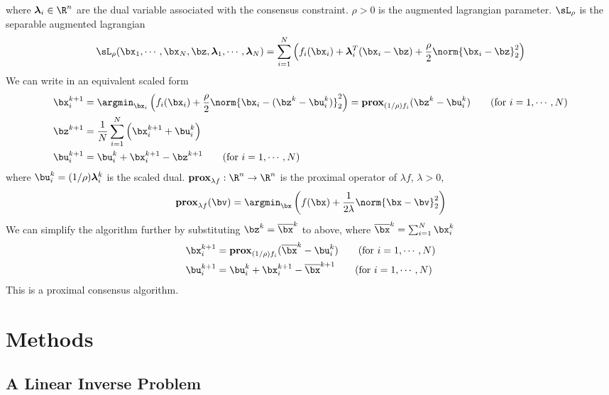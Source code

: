 \documentclass[11pt]{article}
\newcommand{\prox}{\textbf{prox}}
\newcommand{\blambda}{\boldsymbol{\lambda}}
\begin{document}
where $\blambda_i\in\R^n$ are the dual variable associated with the consensus constraint. $\rho>0$ is the augmented lagrangian parameter. $\sL_{\rho}$ is the separable augmented lagrangian
\[
    \sL_{\rho}(\bx_1,\cdots,\bx_N,\bz,\blambda_1,\cdots,\blambda_N) = \sum_{i=1}^N 
        \left( 
            f_i(\bx_i) + \blambda_i^T (\bx_i-\bz) + \frac{\rho}{2} \norm{\bx_i-\bz}_2^2 
        \right)
\]
We can write in an equivalent scaled form 
\begin{align*}
    \bx_i^{k+1} 
        &= \argmin_{\bx_i} \left( f_i(\bx_i) + \frac{\rho}{2} \norm{\bx_i-(\bz^k-\bu_i^k)}_2^2 \right) 
         = \prox_{(1/\rho)f_i}(\bz^k-\bu_i^k) 
         \tag{for $i=1,\cdots,N$}\\
    \bz^{k+1}
        &= \frac{1}{N} \sum_{i=1}^N \left( \bx_i^{k+1} + \bu_i^k \right) \\
    \bu_i^{k+1}
        &= \bu_i^k + \bx_i^{k+1} - \bz^{k+1} \tag{for $i=1,\cdots,N$}
\end{align*}
where $\bu_i^k = (1/\rho)\blambda_i^k$ is the scaled dual. $\prox_{\lambda f}: \R^n \to \R^n$ is the proximal operator of $\lambda f$, $\lambda >0$, 
\[
    \prox_{\lambda f}(\bv) = \argmin_{\bx} \left( f(\bx) + \frac{1}{2\lambda} \norm{\bx-\bv}_2^2 \right)    
\]
We can simplify the algorithm further by substituting $\bz^k = \overline{\bx}^k$ to above, where $\overline{\bx}^k = \sum_{i=1}^N \bx_i^k$ \cite{boydDistributedOptimizationStatistical2011,parikhProximalAlgorithms2014} 
\begin{align*}
    \bx_i^{k+1} 
        &= \prox_{(1/\rho)f_i}(\overline{\bx}^k-\bu_i^k) 
         \tag{for $i=1,\cdots,N$}\\
    \bu_i^{k+1}
        &= \bu_i^k + \bx_i^{k+1} - \overline{\bx}^{k+1} \tag{for $i=1,\cdots,N$}
\end{align*}
This is a proximal consensus algorithm.



\section{Methods}

\subsection{A Linear Inverse Problem}
\end{document}
